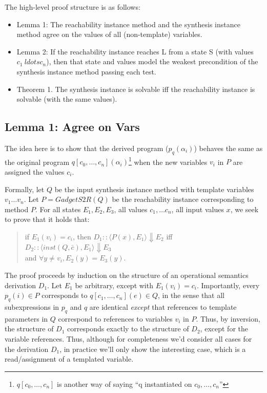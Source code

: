 \documentclass[11pt]{article}
\begin{document}
The high-level proof structure is as follows:
\begin{itemize}
\item Lemma 1: The reachability instance method and the synthesis instance
  method agree on the values of all (non-template) variables.
\item Lemma 2: If the reachability instance reaches L from a state S (with
  values $c_1\ ldots c_n$), then that state and values model the weakest
  precondition of the synthesis instance method passing each test.
\item Theorem 1. The synthesis instance is solvable iff the reachability
  instance is solvable (with the same values). 
\end{itemize}

\vspace{1ex}

\subsection{Lemma 1: Agree on Vars}

The idea here is to show that the derived program ($p_q(\alpha_i)$) behaves the
same as the original program $q[c_0,\ldots,c_n](\alpha_i)$\footnote{$q[c_0,\ldots,c_n]$ is another way of saying ``q instantiated on $c_0,\ldots,c_n$''} when the new variables
$v_i$ in $P$ are assigned the values $c_i$. 

Formally, let $Q$ be the input synthesis instance method with template variables
$v_1 \ldots v_n$. Let $P = GadgetS2R(Q)$ be the reachability instance
corresponding to method $P$. For all states $E_1, E_2, E_3$, all values
$c_1, \ldots c_n$, all input values $x$, we seek to prove that it holds that:

\begin{quote}
  if $E_1(v_i) = c_i$, then $D_1 :: \langle P(x), E_1\rangle \Downarrow E_2$ iff \\
  $D_2 :: \langle inst(Q,\bar{c}), E_1 \rangle \Downarrow E_3$ \\
  and $\forall y \neq v_i, E_2(y) = E_3(y)$.
\end{quote}

The proof proceeds by induction on the structure of an operational semantics
derivation $D_1$. Let $E_1$ be arbitrary, except with $E_1(v_i) = c_i$.
Importantly, every $p_q(i) \in P$ corresponds to $q[c_1,\ldots,c_n](e) \in Q$,
in the sense that all subexpressions in $p_q$ and $q$ are identical
\emph{except} that references to template parameters  in $Q$
correspond to references to variables $v_i$ in $P$. Thus, by inversion, the
structure of $D_1$ corresponds exactly to the structure of $D_2$, except for the
variable references.  Thus, although for completeness we'd consider all cases
for the derivation $D_1$, in practice we'll only show the interesting case,
which is a read/assignment of a templated variable.  
\end{document}
